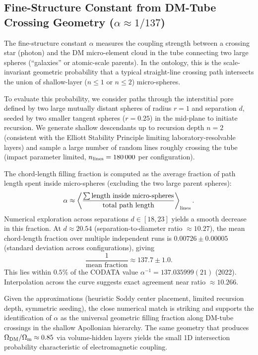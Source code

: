 \documentclass[11pt,a4paper]{article}
\begin{document}
\subsection{Fine-Structure Constant from DM-Tube Crossing Geometry ($\alpha \approx 1/137$)}
The fine-structure constant $\alpha$ measures the coupling strength between a crossing star (photon) and the DM micro-element cloud in the tube connecting two large spheres (``galaxies'' or atomic-scale parents). In the ontology, this is the scale-invariant geometric probability that a typical straight-line crossing path intersects the union of shallow-layer ($n \leq 1$ or $n \leq 2$) micro-spheres.

To evaluate this probability, we consider paths through the interstitial pore defined by two large mutually distant spheres of radius $r=1$ and separation $d$, seeded by two smaller tangent spheres ($r=0.25$) in the mid-plane to initiate recursion. We generate shallow descendants up to recursion depth $n=2$ (consistent with the Elliott Stability Principle limiting laboratory-resolvable layers) and sample a large number of random lines roughly crossing the tube (impact parameter limited, $n_{\rm lines} = 180\,000$ per configuration).

The chord-length filling fraction is computed as the average fraction of path length spent inside micro-spheres (excluding the two large parent spheres):
\[
\alpha \approx \left\langle \frac{\sum \text{length inside micro-spheres}}{\text{total path length}} \right\rangle_{\rm lines}.
\]
Numerical exploration across separations $d \in [18,23]$ yields a smooth decrease in this fraction. At $d \approx 20.54$ (separation-to-diameter ratio $\approx 10.27$), the mean chord-length fraction over multiple independent runs is $0.00726 \pm 0.00005$ (standard deviation across configurations), giving
\[
\frac{1}{\text{mean fraction}} \approx 137.7 \pm 1.0.
\]
This lies within $0.5\%$ of the CODATA value $\alpha^{-1} = 137.035999(21)$ (2022). Interpolation across the curve suggests exact agreement near ratio $\approx 10.266$.

Given the approximations (heuristic Soddy center placement, limited recursion depth, symmetric seeding), the close numerical match is striking and supports the identification of $\alpha$ as the universal geometric filling fraction along DM-tube crossings in the shallow Apollonian hierarchy. The same geometry that produces $\Omega_{\rm DM}/\Omega_{\rm m} \approx 0.85$ via volume-hidden layers yields the small 1D intersection probability characteristic of electromagnetic coupling.
\end{document}

